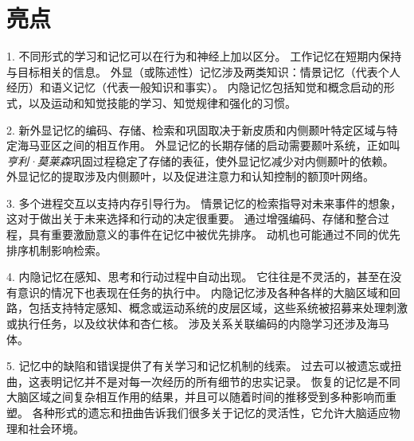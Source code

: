 \section{亮点}

1. 不同形式的学习和记忆可以在行为和神经上加以区分。 工作记忆在短期内保持与目标相关的信息。
外显（或陈述性）记忆涉及两类知识：情景记忆（代表个人经历）和语义记忆（代表一般知识和事实）。
内隐记忆包括知觉和概念启动的形式，以及运动和知觉技能的学习、知觉规律和强化的习惯。 


2. 新外显记忆的编码、存储、检索和巩固取决于新皮质和内侧颞叶特定区域与特定海马亚区之间的相互作用。
外显记忆的长期存储的启动需要颞叶系统，正如叫\textit{亨利·莫莱森}巩固过程稳定了存储的表征，使外显记忆减少对内侧颞叶的依赖。
外显记忆的提取涉及内侧颞叶，以及促进注意力和认知控制的额顶叶网络。


3. 多个进程交互以支持内存引导行为。
情景记忆的检索指导对未来事件的想象，这对于做出关于未来选择和行动的决定很重要。
通过增强编码、存储和整合过程，具有重要激励意义的事件在记忆中被优先排序。
动机也可能通过不同的优先排序机制影响检索。 


4. 内隐记忆在感知、思考和行动过程中自动出现。
它往往是不灵活的，甚至在没有意识的情况下也表现在任务的执行中。
内隐记忆涉及各种各样的大脑区域和回路，包括支持特定感知、概念或运动系统的皮层区域，这些系统被招募来处理刺激或执行任务，以及纹状体和杏仁核。
涉及关系关联编码的内隐学习还涉及海马体。


5. 记忆中的缺陷和错误提供了有关学习和记忆机制的线索。
过去可以被遗忘或扭曲，这表明记忆并不是对每一次经历的所有细节的忠实记录。
恢复的记忆是不同大脑区域之间复杂相互作用的结果，并且可以随着时间的推移受到多种影响而重塑。
各种形式的遗忘和扭曲告诉我们很多关于记忆的灵活性，它允许大脑适应物理和社会环境。


